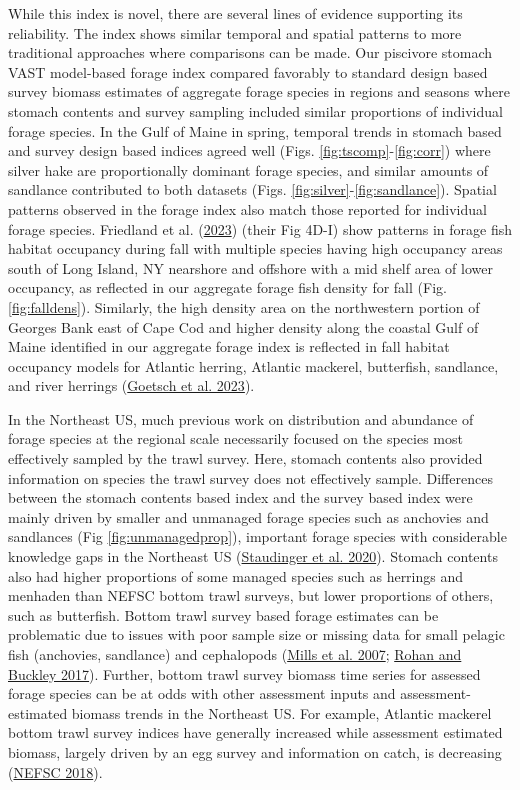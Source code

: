 \documentclass[
]{article}
\begin{document}
While this index is novel, there are several lines of evidence supporting its reliability. The index shows similar temporal and spatial patterns to more traditional approaches where comparisons can be made. Our piscivore stomach VAST model-based forage index compared favorably to standard design based survey biomass estimates of aggregate forage species in regions and seasons where stomach contents and survey sampling included similar proportions of individual forage species. In the Gulf of Maine in spring, temporal trends in stomach based and survey design based indices agreed well (Figs. \ref{fig:tscomp}-\ref{fig:corr}) where silver hake are proportionally dominant forage species, and similar amounts of sandlance contributed to both datasets (Figs. \ref{fig:silver}-\ref{fig:sandlance}). Spatial patterns observed in the forage index also match those reported for individual forage species. Friedland et al. (\protect\hyperlink{ref-friedland_forage_2023}{2023}) (their Fig 4D-I) show patterns in forage fish habitat occupancy during fall with multiple species having high occupancy areas south of Long Island, NY nearshore and offshore with a mid shelf area of lower occupancy, as reflected in our aggregate forage fish density for fall (Fig. \ref{fig:falldens}). Similarly, the high density area on the northwestern portion of Georges Bank east of Cape Cod and higher density along the coastal Gulf of Maine identified in our aggregate forage index is reflected in fall habitat occupancy models for Atlantic herring, Atlantic mackerel, butterfish, sandlance, and river herrings (\protect\hyperlink{ref-goetsch_surface_2023}{Goetsch et al. 2023}).

In the Northeast US, much previous work on distribution and abundance of forage species at the regional scale necessarily focused on the species most effectively sampled by the trawl survey. Here, stomach contents also provided information on species the trawl survey does not effectively sample. Differences between the stomach contents based index and the survey based index were mainly driven by smaller and unmanaged forage species such as anchovies and sandlances (Fig \ref{fig:unmanagedprop}), important forage species with considerable knowledge gaps in the Northeast US (\protect\hyperlink{ref-staudinger_role_2020}{Staudinger et al. 2020}). Stomach contents also had higher proportions of some managed species such as herrings and menhaden than NEFSC bottom trawl surveys, but lower proportions of others, such as butterfish. Bottom trawl survey based forage estimates can be problematic due to issues with poor sample size or missing data for small pelagic fish (anchovies, sandlance) and cephalopods (\protect\hyperlink{ref-mills_diets_2007}{Mills et al. 2007}; \protect\hyperlink{ref-rohan_spatial_2017}{Rohan and Buckley 2017}). Further, bottom trawl survey biomass time series for assessed forage species can be at odds with other assessment inputs and assessment-estimated biomass trends in the Northeast US. For example, Atlantic mackerel bottom trawl survey indices have generally increased while assessment estimated biomass, largely driven by an egg survey and information on catch, is decreasing (\protect\hyperlink{ref-nefsc_64th_2018}{NEFSC 2018}).
\end{document}
